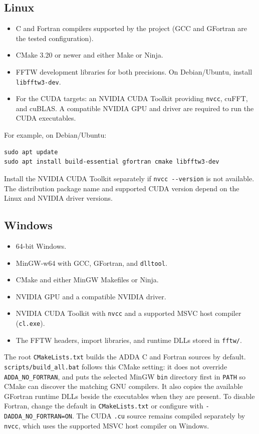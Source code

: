\documentclass[11pt,a4paper]{article}
\newcommand{\code}[1]{\nolinkurl{#1}}
\begin{document}
\subsection{Linux}

\begin{itemize}
  \item C and Fortran compilers supported by the project (GCC and GFortran are
        the tested configuration).
  \item CMake 3.20 or newer and either Make or Ninja.
  \item FFTW development libraries for both precisions. On Debian/Ubuntu,
        install \code{libfftw3-dev}.
  \item For the CUDA targets: an NVIDIA CUDA Toolkit providing \code{nvcc},
        cuFFT, and cuBLAS. A compatible NVIDIA GPU and driver are required to
        run the CUDA executables.
\end{itemize}

For example, on Debian/Ubuntu:

\begin{lstlisting}
sudo apt update
sudo apt install build-essential gfortran cmake libfftw3-dev
\end{lstlisting}

Install the NVIDIA CUDA Toolkit separately if \code{nvcc --version} is not
available. The distribution package name and supported CUDA version depend on
the Linux and NVIDIA driver versions.

\clearpage
\subsection{Windows}

\begin{itemize}
  \item 64-bit Windows.
  \item MinGW-w64 with GCC, GFortran, and \code{dlltool}.
  \item CMake and either MinGW Makefiles or Ninja.
  \item NVIDIA GPU and a compatible NVIDIA driver.
  \item NVIDIA CUDA Toolkit with \code{nvcc} and a supported MSVC host compiler
        (\code{cl.exe}).
  \item The FFTW headers, import libraries, and runtime DLLs stored in
        \code{fftw/}.
\end{itemize}

The root \code{CMakeLists.txt} builds the ADDA C and Fortran sources by default.
\code{scripts/build_all.bat} follows this CMake setting: it does not override
\code{ADDA_NO_FORTRAN}, and puts the selected MinGW \code{bin} directory first
in \code{PATH} so CMake can discover the matching GNU compilers. It also copies
the available GFortran runtime DLLs beside the executables when they are
present. To disable Fortran, change the default in \code{CMakeLists.txt} or
configure with \code{-DADDA_NO_FORTRAN=ON}. The CUDA \code{.cu} source remains
compiled separately by \code{nvcc}, which uses the supported MSVC host compiler
on Windows.
\end{document}
